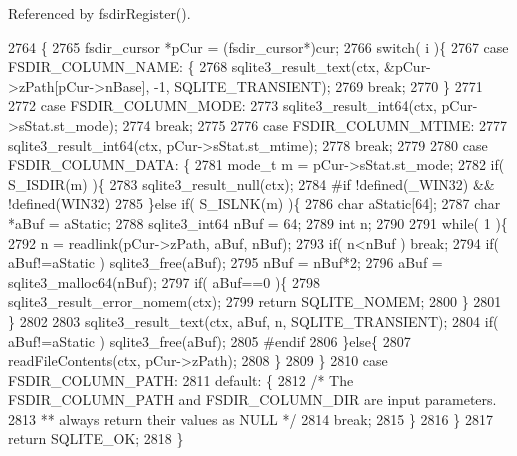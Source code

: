 Referenced by fsdir\+Register().


\begin{DoxyCode}
2764  \{
2765   fsdir_cursor *pCur = (fsdir_cursor*)cur;
2766   \textcolor{keywordflow}{switch}( i )\{
2767     \textcolor{keywordflow}{case} FSDIR_COLUMN_NAME: \{
2768       sqlite3_result_text(ctx, &pCur->zPath[pCur->nBase], -1, SQLITE_TRANSIENT);
2769       \textcolor{keywordflow}{break};
2770     \}
2771 
2772     \textcolor{keywordflow}{case} FSDIR_COLUMN_MODE:
2773       sqlite3_result_int64(ctx, pCur->sStat.st\_mode);
2774       \textcolor{keywordflow}{break};
2775 
2776     \textcolor{keywordflow}{case} FSDIR_COLUMN_MTIME:
2777       sqlite3_result_int64(ctx, pCur->sStat.st\_mtime);
2778       \textcolor{keywordflow}{break};
2779 
2780     \textcolor{keywordflow}{case} FSDIR_COLUMN_DATA: \{
2781       mode\_t m = pCur->sStat.st\_mode;
2782       \textcolor{keywordflow}{if}( S\_ISDIR(m) )\{
2783         sqlite3_result_null(ctx);
2784 \textcolor{preprocessor}{#if !defined(\_WIN32) && !defined(WIN32)}
2785       \}\textcolor{keywordflow}{else} \textcolor{keywordflow}{if}( S\_ISLNK(m) )\{
2786         \textcolor{keywordtype}{char} aStatic[64];
2787         \textcolor{keywordtype}{char} *aBuf = aStatic;
2788         sqlite3_int64 nBuf = 64;
2789         \textcolor{keywordtype}{int} n;
2790 
2791         \textcolor{keywordflow}{while}( 1 )\{
2792           n = readlink(pCur->zPath, aBuf, nBuf);
2793           \textcolor{keywordflow}{if}( n<nBuf ) \textcolor{keywordflow}{break};
2794           \textcolor{keywordflow}{if}( aBuf!=aStatic ) sqlite3_free(aBuf);
2795           nBuf = nBuf*2;
2796           aBuf = sqlite3_malloc64(nBuf);
2797           \textcolor{keywordflow}{if}( aBuf==0 )\{
2798             sqlite3_result_error_nomem(ctx);
2799             \textcolor{keywordflow}{return} SQLITE_NOMEM;
2800           \}
2801         \}
2802 
2803         sqlite3_result_text(ctx, aBuf, n, SQLITE_TRANSIENT);
2804         \textcolor{keywordflow}{if}( aBuf!=aStatic ) sqlite3_free(aBuf);
2805 \textcolor{preprocessor}{#endif}
2806       \}\textcolor{keywordflow}{else}\{
2807         readFileContents(ctx, pCur->zPath);
2808       \}
2809     \}
2810     \textcolor{keywordflow}{case} FSDIR_COLUMN_PATH:
2811     \textcolor{keywordflow}{default}: \{
2812       \textcolor{comment}{/* The FSDIR\_COLUMN\_PATH and FSDIR\_COLUMN\_DIR are input parameters.}
2813 \textcolor{comment}{      ** always return their values as NULL */}
2814       \textcolor{keywordflow}{break};
2815     \}
2816   \}
2817   \textcolor{keywordflow}{return} SQLITE_OK;
2818 \}
\end{DoxyCode}
\mbox{\label{shell_8c_a9e9319ad7e059f597505e007c2e4918d}} 
